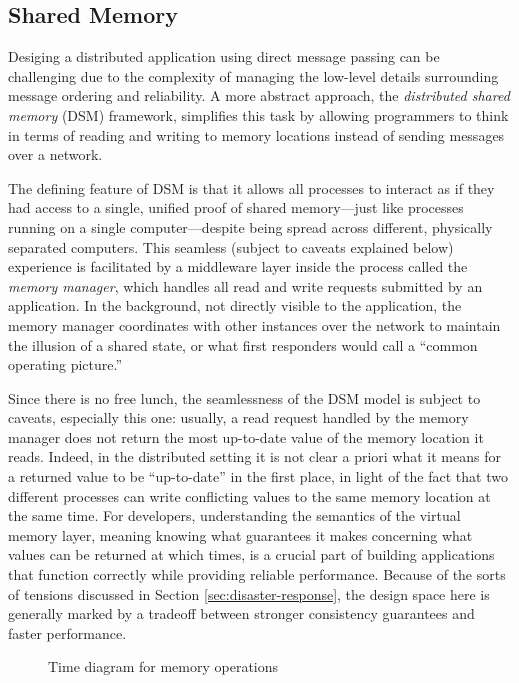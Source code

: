 \documentclass[]             %
{NASA}                       %
\theoremstyle{definition}
\begin{document}
\subsection{Shared Memory}
\label{ssec:shared-memory}
Desiging a distributed application using direct message passing can be
challenging due to the complexity of managing the low-level details
surrounding message ordering and reliability. A more abstract
approach, the \emph{distributed shared memory} (DSM) framework,
simplifies this task by allowing programmers to think in terms of
reading and writing to memory locations instead of sending messages
over a network.

The defining feature of DSM is that it allows all processes to
interact as if they had access to a single, unified proof of shared
memory---just like processes running on a single computer---despite
being spread across different, physically separated computers.  This
seamless (subject to caveats explained below) experience is
facilitated by a middleware layer inside the process called the
\emph{memory manager}, which handles all read and write requests
submitted by an application. In the background, not directly visible
to the application, the memory manager coordinates with other
instances over the network to maintain the illusion of a shared state,
or what first responders would call a ``common operating picture.''

Since there is no free lunch, the seamlessness of the DSM model is
subject to caveats, especially this one: usually, a read request
handled by the memory manager does not return the most up-to-date
value of the memory location it reads. Indeed, in the distributed
setting it is not clear a priori what it means for a returned value to
be ``up-to-date'' in the first place, in light of the fact that two
different processes can write conflicting values to the same memory
location at the same time. For developers, understanding the semantics
of the virtual memory layer, meaning knowing what guarantees it makes
concerning what values can be returned at which times, is a crucial
part of building applications that function correctly while providing
reliable performance. Because of the sorts of tensions discussed in
Section \ref{sec:disaster-response}, the design space here is
generally marked by a tradeoff between stronger consistency guarantees
and faster performance.

\begin{figure}
    \centering
    
    \caption{Time diagram for memory operations}
    \label{fig:dsm-example-1}
\end{figure}
\end{document}

